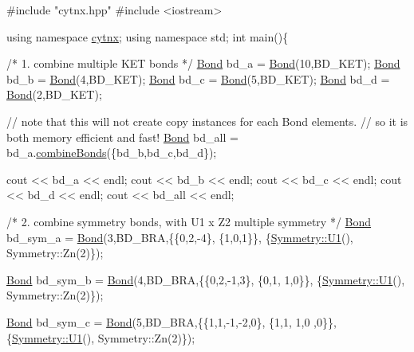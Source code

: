 \begin{DoxyCodeInclude}
\textcolor{preprocessor}{#include "cytnx.hpp"}
\textcolor{preprocessor}{#include <iostream>}


\textcolor{keyword}{using namespace }\hyperlink{namespacecytnx}{cytnx};
\textcolor{keyword}{using namespace }std;
\textcolor{keywordtype}{int} main()\{ 

    \textcolor{comment}{/* 1.}
\textcolor{comment}{        combine multiple KET bonds}
\textcolor{comment}{    */}
    \hyperlink{classcytnx_1_1Bond}{Bond} bd\_a = \hyperlink{classcytnx_1_1Bond}{Bond}(10,BD\_KET);
    \hyperlink{classcytnx_1_1Bond}{Bond} bd\_b = \hyperlink{classcytnx_1_1Bond}{Bond}(4,BD\_KET);
    \hyperlink{classcytnx_1_1Bond}{Bond} bd\_c = \hyperlink{classcytnx_1_1Bond}{Bond}(5,BD\_KET);
    \hyperlink{classcytnx_1_1Bond}{Bond} bd\_d = \hyperlink{classcytnx_1_1Bond}{Bond}(2,BD\_KET);
    
    \textcolor{comment}{// note that this will not create copy instances for each Bond elements.}
    \textcolor{comment}{// so it is both memory efficient and fast!}
    \hyperlink{classcytnx_1_1Bond}{Bond} bd\_all = bd\_a.\hyperlink{classcytnx_1_1Bond_a4a1d060cf2d0c44d83356df757a802d1}{combineBonds}(\{bd\_b,bd\_c,bd\_d\});
    
    cout << bd\_a << endl;
    cout << bd\_b << endl;
    cout << bd\_c << endl;   
    cout << bd\_d << endl;
    cout << bd\_all << endl;


    \textcolor{comment}{/* 2.}
\textcolor{comment}{        combine symmetry bonds, }
\textcolor{comment}{        with U1 x Z2 multiple symmetry }
\textcolor{comment}{    */}
    \hyperlink{classcytnx_1_1Bond}{Bond} bd\_sym\_a = \hyperlink{classcytnx_1_1Bond}{Bond}(3,BD\_BRA,\{\{0,2,-4\},
                               \{1,0,1\}\},
                              \{\hyperlink{classcytnx_1_1Symmetry_a9218fd66fc9cca64cd3d792e0019592a}{Symmetry::U1}(),
                               Symmetry::Zn(2)\});
                                
    \hyperlink{classcytnx_1_1Bond}{Bond} bd\_sym\_b = \hyperlink{classcytnx_1_1Bond}{Bond}(4,BD\_BRA,\{\{0,2,-1,3\},
                               \{0,1, 1,0\}\},
                              \{\hyperlink{classcytnx_1_1Symmetry_a9218fd66fc9cca64cd3d792e0019592a}{Symmetry::U1}(),
                               Symmetry::Zn(2)\});

    \hyperlink{classcytnx_1_1Bond}{Bond} bd\_sym\_c = \hyperlink{classcytnx_1_1Bond}{Bond}(5,BD\_BRA,\{\{1,1,-1,-2,0\},
                               \{1,1, 1,0 ,0\}\},
                              \{\hyperlink{classcytnx_1_1Symmetry_a9218fd66fc9cca64cd3d792e0019592a}{Symmetry::U1}(),
                               Symmetry::Zn(2)\});


\end{DoxyCodeInclude}
